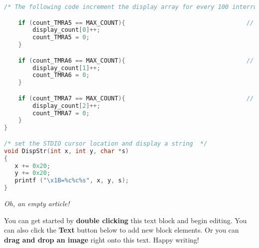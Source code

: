 \begin{lstlisting}[language=C++]
	/* The following code increment the display array for every 100 interrupts for a respective timer, and resets the count variable */

	if (count_TMRA5 == MAX_COUNT){									// if Timer A5 has interrupted the CPU 100 times
		display_count[0]++;												// increment the display counter
		count_TMRA5 = 0;													// clear the Timer A5 counter
	}

	if (count_TMRA6 == MAX_COUNT){									// if Timer A6 has interrupted the CPU 100 times
		display_count[1]++;												// increment the display counter
		count_TMRA6 = 0;													// clear the Timer A6 counter
	}

	if (count_TMRA7 == MAX_COUNT){									// if Timer A6 has interrupted the CPU 100 times
		display_count[2]++;												// increment the display counter
		count_TMRA7 = 0;													// clear the Timer A6 counter
	}
}

/* set the STDIO cursor location and display a string  */
void DispStr(int x, int y, char *s)
{
   x += 0x20;
   y += 0x20;
   printf ("\x1B=%c%c%s", x, y, s);
}
\end{lstlisting}

\textit{Oh, an empty article!} 

You can get started by \textbf{double clicking} this text block and begin editing. You can also click the \textbf{Text} button below to add new block elements. Or you can \textbf{drag and drop an image} right onto this text. Happy writing!